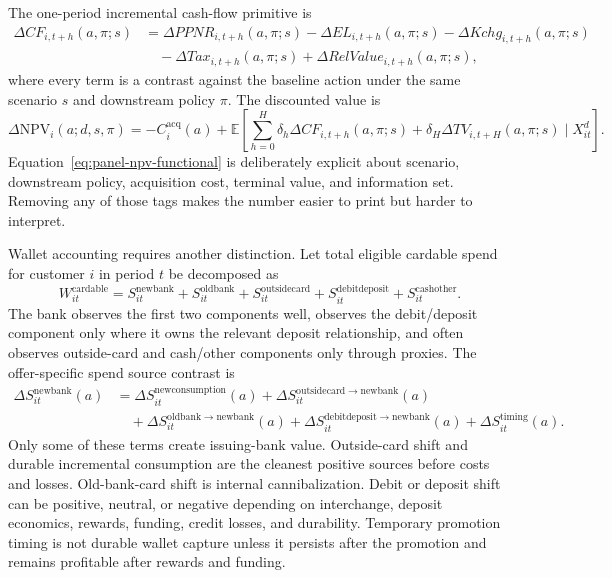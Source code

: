 \documentclass[11pt]{article}
\newcommand{\E}{\mathbb{E}}
\newcommand{\NPV}{\mathrm{NPV}}
\newcommand{\1}{\mathbf{1}}
\begin{document}
The one-period incremental cash-flow primitive is
\begin{align}
  \Delta CF_{i,t+h}(a,\pi;s)
  &=
  \Delta PPNR_{i,t+h}(a,\pi;s)
  - \Delta EL_{i,t+h}(a,\pi;s)
  - \Delta Kchg_{i,t+h}(a,\pi;s) \nonumber\\
  &\quad
  - \Delta Tax_{i,t+h}(a,\pi;s)
  + \Delta RelValue_{i,t+h}(a,\pi;s),
  \label{eq:panel-cf-primitive}
\end{align}
where every term is a contrast against the baseline action under the same
scenario $s$ and downstream policy $\pi$. The discounted value is
\begin{equation}
  \Delta \NPV_i(a;d,s,\pi)
  =
  -C_i^{\mathrm{acq}}(a)
  +
  \E\!\left[
    \sum_{h=0}^{H}\delta_h\Delta CF_{i,t+h}(a,\pi;s)
    +\delta_H\Delta TV_{i,t+H}(a,\pi;s)
    \mid X_{it}^{d}
  \right].
  \label{eq:panel-npv-functional}
\end{equation}
Equation~\eqref{eq:panel-npv-functional} is deliberately explicit about
scenario, downstream policy, acquisition cost, terminal value, and information
set. Removing any of those tags makes the number easier to print but harder to
interpret.

Wallet accounting requires another distinction. Let total eligible cardable
spend for customer $i$ in period $t$ be decomposed as
\begin{equation}
  W_{it}^{\mathrm{cardable}}
  =
  S_{it}^{\mathrm{newbank}}
  +S_{it}^{\mathrm{oldbank}}
  +S_{it}^{\mathrm{outsidecard}}
  +S_{it}^{\mathrm{debitdeposit}}
  +S_{it}^{\mathrm{cashother}}.
  \label{eq:wallet-accounting}
\end{equation}
The bank observes the first two components well, observes the debit/deposit
component only where it owns the relevant deposit relationship, and often
observes outside-card and cash/other components only through proxies. The
offer-specific spend source contrast is
\begin{align}
  \Delta S_{it}^{\mathrm{newbank}}(a)
  &=
  \Delta S_{it}^{\mathrm{newconsumption}}(a)
  +\Delta S_{it}^{\mathrm{outsidecard\rightarrow newbank}}(a)
  \nonumber\\
  &\quad
  +\Delta S_{it}^{\mathrm{oldbank\rightarrow newbank}}(a)
  +\Delta S_{it}^{\mathrm{debitdeposit\rightarrow newbank}}(a)
  +\Delta S_{it}^{\mathrm{timing}}(a).
  \label{eq:spend-source-panel}
\end{align}
Only some of these terms create issuing-bank value. Outside-card shift and
durable incremental consumption are the cleanest positive sources before
costs and losses. Old-bank-card shift is internal cannibalization. Debit or
deposit shift can be positive, neutral, or negative depending on interchange,
deposit economics, rewards, funding, credit losses, and durability. Temporary
promotion timing is not durable wallet capture unless it persists after the
promotion and remains profitable after rewards and funding.
\end{document}
